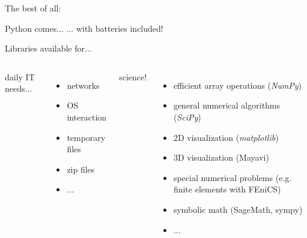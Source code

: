 \begin{frame}{The best of all:}

\begin{exbox}{Python comes...}
	... with \alert{batteries included}!
\end{exbox}

\vspace{-1.25ex}

\begin{center}
	Libraries available for...
\end{center}

\vspace{-4.5ex}

\begin{columns}[t]


\begin{center}
	daily IT needs...
\end{center}

\vspace{-2.5ex}

\begin{itemize}
	\item networks
	\item OS interaction
	\item temporary files
	\item zip files
	\item ...
\end{itemize}


\begin{center}
	\alert{science!}
\end{center}

\vspace{-2.5ex}

\begin{itemize}
	\item efficient array operations (\emph{NumPy})
	\item general numerical algorithms (\emph{SciPy})
	\item 2D visualization (\emph{matplotlib})
	\item 3D visualization (Mayavi)
	\item special numerical problems (e.g. finite elements with FEniCS)
	\item symbolic math (SageMath, sympy)
	\item ...
\end{itemize}

\end{columns}

\end{frame}

